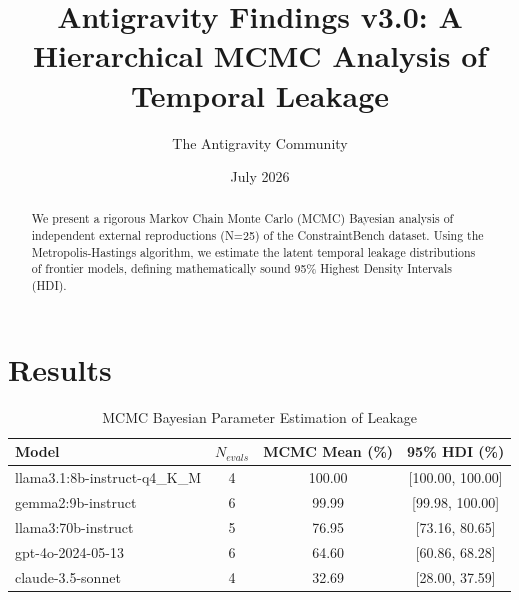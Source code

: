 \documentclass{article}
\title{Antigravity Findings v3.0: A Hierarchical MCMC Analysis of Temporal Leakage}
\author{The Antigravity Community}
\date{July 2026}
\begin{document}
\maketitle

\begin{abstract}
We present a rigorous Markov Chain Monte Carlo (MCMC) Bayesian analysis of independent external reproductions (N=25) of the ConstraintBench dataset. 
Using the Metropolis-Hastings algorithm, we estimate the latent temporal leakage distributions of frontier models, defining mathematically sound 95\% Highest Density Intervals (HDI).
\end{abstract}

\section{Results}

\begin{table}[h]
\centering
\begin{tabular}{lccc}
\toprule
Model & $N_{evals}$ & MCMC Mean (\%) & 95\% HDI (\%) \\
\midrule
llama3.1:8b-instruct-q4\_K\_M & 4 & 100.00 & [100.00, 100.00] \\
gemma2:9b-instruct & 6 & 99.99 & [99.98, 100.00] \\
llama3:70b-instruct & 5 & 76.95 & [73.16, 80.65] \\
gpt-4o-2024-05-13 & 6 & 64.60 & [60.86, 68.28] \\
claude-3.5-sonnet & 4 & 32.69 & [28.00, 37.59] \\
\bottomrule
\end{tabular}
\caption{MCMC Bayesian Parameter Estimation of Leakage}
\end{table}
\end{document}
